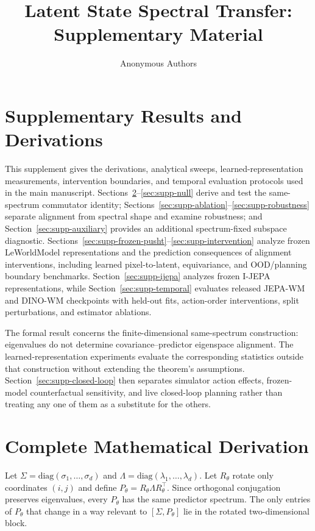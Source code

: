 \documentclass{article}
\title{Latent State Spectral Transfer:\\Supplementary Material}
\author{Anonymous Authors}
\date{}
\newcommand{\comm}[2]{[#1,#2]}
\begin{document}
\maketitle

\section{Supplementary Results and Derivations}

This supplement gives the derivations, analytical sweeps, learned-representation measurements, intervention boundaries, and temporal evaluation protocols used in the main manuscript. Sections~\ref{sec:supp-derivation}--\ref{sec:supp-null} derive and test the same-spectrum commutator identity; Sections~\ref{sec:supp-ablation}--\ref{sec:supp-robustness} separate alignment from spectral shape and examine robustness; and Section~\ref{sec:supp-auxiliary} provides an additional spectrum-fixed subspace diagnostic. Sections~\ref{sec:supp-frozen-pusht}--\ref{sec:supp-intervention} analyze frozen LeWorldModel representations and the prediction consequences of alignment interventions, including learned pixel-to-latent, equivariance, and OOD/planning boundary benchmarks. Section~\ref{sec:supp-ijepa} analyzes frozen I-JEPA representations, while Section~\ref{sec:supp-temporal} evaluates released JEPA-WM and DINO-WM checkpoints with held-out fits, action-order interventions, split perturbations, and estimator ablations.

The formal result concerns the finite-dimensional same-spectrum construction:
eigenvalues do not determine covariance--predictor eigenspace alignment. The
learned-representation experiments evaluate the corresponding statistics
outside that construction without extending the theorem's assumptions.
Section~\ref{sec:supp-closed-loop} then separates simulator action effects,
frozen-model counterfactual sensitivity, and live closed-loop planning rather
than treating any one of them as a substitute for the others.

\section{Complete Mathematical Derivation}
\label{sec:supp-derivation}

Let $\Sigma=\mathrm{diag}(\sigma_1,\ldots,\sigma_d)$ and $\Lambda=\mathrm{diag}(\lambda_1,\ldots,\lambda_d)$. Let $R_\theta$ rotate only coordinates $(i,j)$ and define $P_\theta=R_\theta\Lambda R_\theta^\top$. Since orthogonal conjugation preserves eigenvalues, every $P_\theta$ has the same predictor spectrum. The only entries of $P_\theta$ that change in a way relevant to $\comm{\Sigma}{P_\theta}$ lie in the rotated two-dimensional block.
\end{document}
